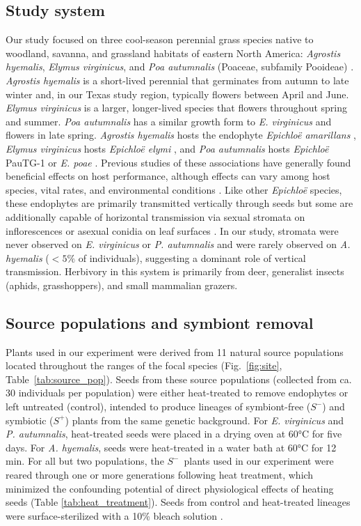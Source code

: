 \documentclass[12pt]{article}\usepackage[]{graphicx}\usepackage[dvipsnames]{xcolor}
\begin{document}
\subsection*{Study system}
Our study focused on three cool-season perennial grass species native to woodland, savanna, and grassland habitats of eastern North America: \emph{Agrostis hyemalis}, \emph{Elymus virginicus}, and \emph{Poa autumnalis} (Poaceae, subfamily Pooideae) \citep{shaw2011guide}.
\emph{Agrostis hyemalis} is a short-lived perennial that germinates from autumn to late winter and, in our Texas study region, typically flowers between April and June.
\emph{Elymus virginicus} is a larger, longer-lived species that flowers throughout spring and summer.
\emph{Poa autumnalis} has a similar growth form to \emph{E. virginicus} and flowers in late spring.
\emph{Agrostis hyemalis} hosts the endophyte \emph{Epichloë amarillans} \citep{white1994endophyte}, \emph{Elymus virginicus} hosts \emph{Epichloë elymi} \citep{liu2023fungi}, and \emph{Poa autumnalis} hosts \emph{Epichloë} PauTG-1 or \emph{E. poae} \citep{gundel2020simulated}.
Previous studies of these associations have generally found beneficial effects on host performance, although effects can vary among host species, vital rates, and environmental conditions \citep{yule2013costs,davitt2011understanding,gundel2020simulated,rudgers2009benefits}.
Like other \emph{Epichloë} species, these endophytes are primarily transmitted vertically through seeds but some are additionally capable of horizontal transmission via sexual stromata on inflorescences or asexual conidia on leaf surfaces \citep{clay2002evolutionary,gundel2020simulated,leuchtmann2014nomenclatural}.
In our study, stromata were never observed on \emph{E. virginicus} or \emph{P. autumnalis} and were rarely observed on \emph{A. hyemalis} ($<5\%$ of individuals), suggesting a dominant role of vertical transmission.
Herbivory in this system is primarily from deer, generalist insects (aphids, grasshoppers), and small mammalian grazers.

\subsection*{Source populations and symbiont removal}
Plants used in our experiment were derived from 11 natural source populations located throughout the ranges of the focal species (Fig.~\ref{fig:site}, Table~\ref{tab:source_pop}). 
Seeds from these source populations (collected from ca. 30 individuals per population) were either heat-treated to remove endophytes or left untreated (control), intended to produce lineages of symbiont-free ($S^-$) and symbiotic ($S^+$) plants from the same genetic background. 
For \emph{E. virginicus} and \emph{P. autumnalis}, heat-treated seeds were placed in a drying oven at 60°C for five days. 
For \emph{A. hyemalis}, seeds were heat-treated in a water bath at 60°C for 12 min.
For all but two populations, the $S^-$\ plants used in our experiment were reared through one or more generations following heat treatment, which minimized the confounding potential of direct physiological effects of heating seeds (Table \ref{tab:heat_treatment}). 
Seeds from control and heat-treated lineages were surface-sterilized with a  10\% bleach solution \citep{Sahu2022sterilization}.
\end{document}
